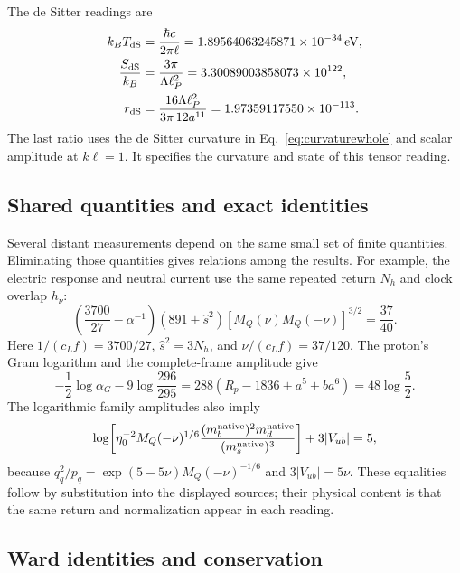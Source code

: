 \documentclass[aps,prx,onecolumn,10pt,notitlepage,nofootinbib,longbibliography]{revtex4-2}
\numberwithin{equation}{section}
\numberwithin{table}{section}
\newcommand{\eV}{\,\mathrm{eV}}
\newcommand{\hover}{h_\nu}
\begin{document}
The de Sitter readings\cite{GibbonsHawking} are
\begin{align}
 k_BT_{\mathrm{dS}}&=\frac{\hbar c}{2\pi\ell}
 =1.89564063245871\times10^{-34}\eV,\notag\\
 \frac{S_{\mathrm{dS}}}{k_B}&=\frac{3\pi}{\Lambda\ell_P^2}
 =3.30089003858073\times10^{122},\notag\\
 r_{\mathrm{dS}}&=\frac{16\Lambda\ell_P^2}{3\pi\,12a^{11}}
 =1.97359117550\times10^{-113}.
\end{align}
The last ratio uses the de Sitter curvature in Eq.~\eqref{eq:curvaturewhole} and scalar amplitude at $k\ell=1$. It specifies the curvature and state of this tensor reading.

\subsection{Shared quantities and exact identities}
Several distant measurements depend on the same small set of finite quantities. Eliminating those quantities gives relations among the results. For example, the electric response and neutral current use the same repeated return $N_h$ and clock overlap $\hover$:
\begin{equation}
 \left(\frac{3700}{27}-\alpha^{-1}\right)
 (891+\widehat s^2)[M_Q(\nu)M_Q(-\nu)]^{3/2}
 =\frac{37}{40}.
\end{equation}
Here $1/(c_Lf)=3700/27$, $\widehat s^2=3N_h$, and $\nu/(c_Lf)=37/120$. The proton's Gram logarithm and the complete-frame amplitude give
\begin{equation}
 -\frac12\log\alpha_G-9\log\frac{296}{295}
 =288\left(R_p-1836+a^5+ba^6\right)
 =48\log\frac52.
\end{equation}
The logarithmic family amplitudes also imply
\begin{equation}
 \log\!\left[\eta_0^{-2}M_Q(-\nu)^{1/6}
 \frac{(m_b^{\rm native})^2m_d^{\rm native}}{(m_s^{\rm native})^3}\right]
 +3|V_{ub}|=5,
\end{equation}
because $q_q^2/p_q=\exp(5-5\nu)M_Q(-\nu)^{-1/6}$ and $3|V_{ub}|=5\nu$.
These equalities follow by substitution into the displayed sources; their physical content is that the same return and normalization appear in each reading.

\subsection{Ward identities and conservation}\label{ward-identities-and-conservation}
\end{document}
